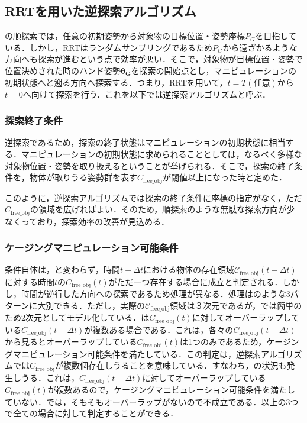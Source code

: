 \documentclass[a4paper,twoside,12pt,papersize, dvipdfmx]{iirthesis}
\begin{document}
{\subsection{RRTを用いた逆探索アルゴリズム}
の順探索では，任意の初期姿勢から対象物の目標位置・姿勢座標$P_G$を目指している．しかし，RRTはランダムサンプリングであるため$P_G$から遠ざかるような方向へも探索が進むという点で効率が悪い．そこで，対象物が目標位置・姿勢で位置決めされた時のハンド姿勢$\bm{\theta_G}$を探索の開始点とし，マニピュレーションの初期状態へと遡る方向へ探索する．つまり，RRTを用いて，$t=T (任意)$から$t=0$へ向けて探索を行う．これを以下では逆探索アルゴリズムと呼ぶ．

\subsubsection{探索終了条件}
逆探索であるため，探索の終了状態はマニピュレーションの初期状態に相当する．マニピュレーションの初期状態に求められることとしては，なるべく多様な対象物位置・姿勢を取り扱えるということが挙げられる．そこで，探索の終了条件を，物体が取りうる姿勢群を表す$C_{\mathrm{free\_obj}}$が閾値以上になった時と定めた．\par
このように，逆探索アルゴリズムでは探索の終了条件に座標の指定がなく，ただ$C_{\mathrm{free\_obj}}$の領域を広げればよい．そのため，順探索のような無駄な探索方向が少なくっており，探索効率の改善が見込める．

\subsubsection{ケージングマニピュレーション可能条件}\label{subsec::planner::revcm}
条件自体は，と変わらず，時間$t-\Delta t$における物体の存在領域$\mathcal{C}_{\mathrm{free\_obj}}(t-\Delta t)$に対する時間$t$の$C_{\mathrm{free\_obj}}(t)$がただ一つ存在する場合に成立と判定される．しかし，時間が逆行した方向への探索であるため処理が異なる．処理はのような3パターンに大別できる．ただし，実際の$\mathcal{C}_{\mathrm{free\_obj}}$領域は３次元であるが，では簡単のため2次元としてモデル化している．は$C_{\mathrm{free\_obj}}(t)$に対してオーバーラップしている$C_{\mathrm{free\_obj}}(t-\Delta t)$が複数ある場合である．これは，各々の$C_{\mathrm{free\_obj}}(t-\Delta t)$から見るとオーバーラップしている$C_{\mathrm{free\_obj}}(t)$は1つのみであるため，ケージングマニピュレーション可能条件を満たしている．この判定は，逆探索アルゴリズムでは$C_{\mathrm{free\_obj}}$が複数個存在しうることを意味している．すなわち，の状況も発生しうる．これは，$C_{\mathrm{free\_obj}}(t-\Delta t)$に対してオーバーラップしている$C_{\mathrm{free\_obj}}(t)$が複数あるので，ケージングマニピュレーション可能条件を満たしていない．では，そもそもオーバーラップがないので不成立である．以上の3つで全ての場合に対して判定することができる．

}
\end{document}
